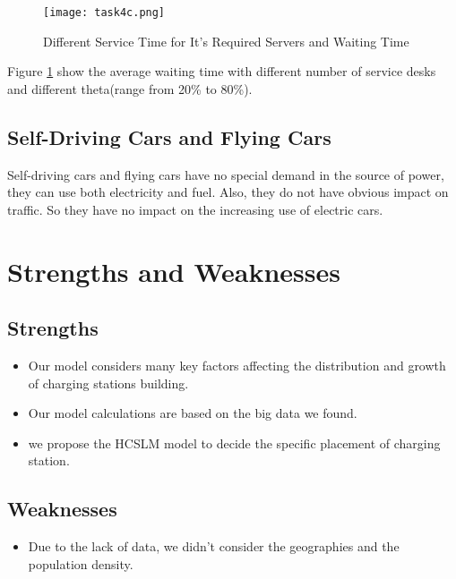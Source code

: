 \documentclass{mcmthesis}
\begin{document}
\begin{figure}[!h]
\small
\centering
\texttt{[image: task4c.png]}
\caption{Different Service Time for It's Required Servers and Waiting Time} \label{fig:Different Service Time for It's Required Servers and Waiting Time}
\end{figure}

Figure \ref{fig:Different Service Time for It's Required Servers and Waiting Time} show the average waiting time with different number of service desks and different theta(range from 20\% to 80\%).

\subsection*{Self-Driving Cars and Flying Cars}
\par Self-driving cars and flying cars have no special demand in the source of power, they can use both electricity and fuel. Also, they do not have obvious impact on traffic. So they have no impact on the increasing use of electric cars.




\section{Strengths and Weaknesses}

\subsection{Strengths}
\begin{itemize}
	\item Our model considers many key factors affecting the distribution and growth of charging stations building.
	\item Our model calculations are based on the big data we found.
	\item we propose the HCSLM model to decide the specific placement of charging station.
\end{itemize}
\subsection{Weaknesses}
\begin{itemize}
	\item Due to the lack of data, we didn’t consider the geographies and the population density.
\end{itemize}
\end{document}
